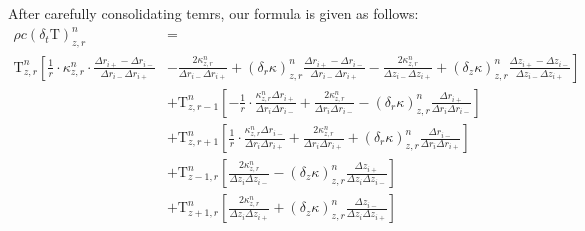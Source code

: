 \documentclass[12pt]{article}
\begin{document}
  After carefully consolidating temrs, our formula is given as follows:
  \begin{equation}
    \begin{aligned}
      \rho c (\delta_t\mathrm{T})^n_{z, r} &= \\
      \mathrm{T}^n_{z, r} \left [\frac{1}{r}\cdot\kappa^n_{z, r}\cdot\frac{\Delta r_{i+} - \Delta r_{i-}}{\Delta r_{i-} \Delta r_{i+}} \right.&\left.- \frac{2\kappa^n_{z, r}}{\Delta r_{i-} \Delta r_{i+}} + (\delta_r\kappa)^n_{z, r}\frac{\Delta r_{i+} - \Delta r_{i-}}{\Delta r_{i-} \Delta r_{i+}} - \frac{2\kappa^n_{z, r}}{\Delta z_{i-} \Delta z_{i+}} + (\delta_z\kappa)^n_{z, r}\frac{\Delta z_{i+} - \Delta z_{i-}}{\Delta z_{i-} \Delta z_{i+}} \right ] \\
       & + \mathrm{T}^n_{z, r-1} \left [-\frac{1}{r}\cdot\frac{\kappa^n_{z, r}\Delta r_{i+}}{\Delta r_{i} \Delta r_{i-}}  + \frac{2\kappa^n_{z, r}}{\Delta r_{i} \Delta r_{i-}} - (\delta_r\kappa)^n_{z, r}\frac{\Delta r_{i+}}{\Delta r_{i} \Delta r_{i-}} \right ] \\
       & + \mathrm{T}^n_{z, r+1} \left [\frac{1}{r}\cdot\frac{\kappa^n_{z, r}\Delta r_{i-}}{\Delta r_{i} \Delta r_{i+}}  + \frac{2\kappa^n_{z, r}}{\Delta r_{i} \Delta r_{i+}} + (\delta_r\kappa)^n_{z, r}\frac{\Delta r_{i-}}{\Delta r_{i} \Delta r_{i+}} \right ] \\
       & + \mathrm{T}^n_{z-1, r} \left [ \frac{2\kappa^n_{z, r}}{\Delta z_{i} \Delta z_{i-}} - (\delta_z\kappa)^n_{z, r}\frac{\Delta z_{i+}}{\Delta z_{i} \Delta z_{i-}} \right ] \\
       & + \mathrm{T}^n_{z+1, r} \left [ \frac{2\kappa^n_{z, r}}{\Delta z_{i} \Delta z_{i+}} + (\delta_z\kappa)^n_{z, r}\frac{\Delta z_{i-}}{\Delta z_{i} \Delta z_{i+}} \right ] \\
    \end{aligned}
  \end{equation} 
\end{document}
